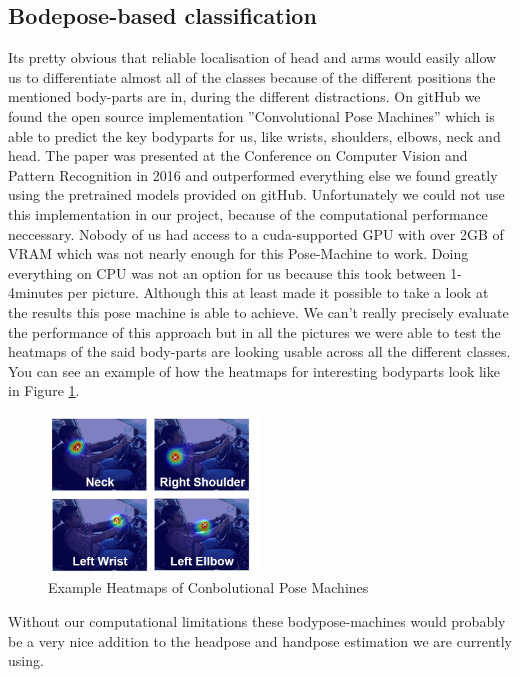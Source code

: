 \documentclass[10pt,twocolumn,letterpaper]{article}
\begin{document}
\subsection{Bodepose-based classification}
Its pretty obvious that reliable localisation of head and arms would easily allow us to differentiate almost all of the classes because of the different positions the mentioned body-parts are in, during the different distractions. On gitHub we found the open source implementation ''Convolutional Pose Machines'' which is able to predict the key bodyparts for us, like wrists, shoulders, elbows, neck and head.\cite{DBLP:journals/corr/WeiRKS16} The paper was presented at the Conference on Computer Vision and Pattern Recognition in 2016 and outperformed everything else we found greatly using the pretrained models provided on gitHub. Unfortunately we could not use this implementation in our project, because of the computational performance neccessary. Nobody of us had access to a cuda-supported GPU with over 2GB of VRAM which was not nearly enough for this Pose-Machine to work. Doing everything on CPU was not an option for us because this took between 1-4minutes per picture. Although this at least made it possible to take a look at the results this pose machine is able to achieve. We can't really precisely evaluate the performance of this approach but in all the pictures we were able to test the heatmaps of the said body-parts are looking usable across all the different classes. You can see an example of how the heatmaps for interesting bodyparts look like in Figure \ref{BodyPoseExample}.\\
\begin{figure}[h]
    \centering
    \includegraphics[width=0.5\textwidth]{BodyPoseExample}
    \caption{Example Heatmaps of Conbolutional Pose Machines}
    \label{BodyPoseExample}
\end{figure}

Without our computational limitations these bodypose-machines would probably be a very nice addition to the headpose and handpose estimation we are currently using.
\end{document}
